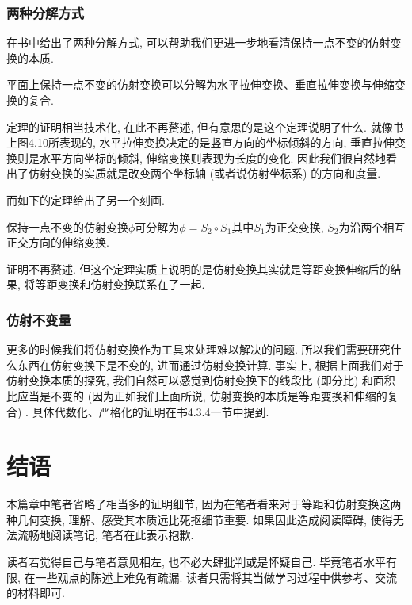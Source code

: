 \documentclass[./main.tex]{subfiles}
\begin{document}
\subsubsection{两种分解方式}
在书中给出了两种分解方式, 可以帮助我们更进一步地看清保持一点不变的仿射变换的本质. 
\begin{theorem}[讲义定理15]
    平面上保持一点不变的仿射变换可以分解为水平拉伸变换、垂直拉伸变换与伸缩变换的复合. 
\end{theorem}
定理的证明相当技术化, 在此不再赘述, 但有意思的是这个定理说明了什么. 就像书上图4.10所表现的, 水平拉伸变换决定的是竖直方向的坐标倾斜的方向, 垂直拉伸变换则是水平方向坐标的倾斜, 伸缩变换则表现为长度的变化. 因此我们很自然地看出了仿射变换的实质就是改变两个坐标轴 (或者说仿射坐标系) 的方向和度量. 

而如下的定理给出了另一个刻画. 
\begin{theorem}[讲义4.4定理16/习题1]
    保持一点不变的仿射变换$\phi$可分解为$\phi=S_2\circ S_1$其中$S_1$为正交变换, $S_2$为沿两个相互正交方向的伸缩变换. 
\end{theorem}
证明不再赘述. 但这个定理实质上说明的是仿射变换其实就是等距变换伸缩后的结果, 将等距变换和仿射变换联系在了一起. 
\subsubsection{仿射不变量}
更多的时候我们将仿射变换作为工具来处理难以解决的问题. 所以我们需要研究什么东西在仿射变换下是不变的, 进而通过仿射变换计算. 事实上, 根据上面我们对于仿射变换本质的探究, 我们自然可以感觉到仿射变换下的线段比 (即分比) 和面积比应当是不变的 (因为正如我们上面所说, 仿射变换的本质是等距变换和伸缩的复合) . 具体代数化、严格化的证明在书4.3.4一节中提到. 
\section{结语}
本篇章中笔者省略了相当多的证明细节, 因为在笔者看来对于等距和仿射变换这两种几何变换, 理解、感受其本质远比死抠细节重要. 如果因此造成阅读障碍, 使得无法流畅地阅读笔记, 笔者在此表示抱歉. 

读者若觉得自己与笔者意见相左, 也不必大肆批判或是怀疑自己. 毕竟笔者水平有限, 在一些观点的陈述上难免有疏漏. 读者只需将其当做学习过程中供参考、交流的材料即可. 
\end{document}
